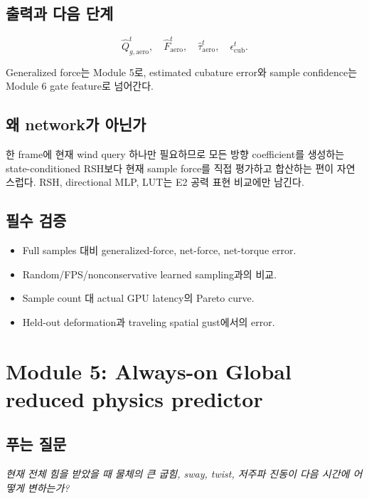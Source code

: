 \documentclass[11pt,a4paper]{article}
\begin{document}
\subsection*{출력과 다음 단계}

\begin{equation}
  \widehat Q_{g,\mathrm{aero}}^t,\quad
  \widehat F_{\mathrm{aero}}^t,\quad
  \widehat\tau_{\mathrm{aero}}^t,\quad
  \epsilon_{\mathrm{cub}}^t.
\end{equation}

Generalized force는 Module 5로,
estimated cubature error와 sample confidence는 Module 6 gate feature로 넘어간다.

\subsection*{왜 network가 아닌가}

한 frame에 현재 wind query 하나만 필요하므로
모든 방향 coefficient를 생성하는 state-conditioned RSH보다
현재 sample force를 직접 평가하고 합산하는 편이 자연스럽다.
RSH, directional MLP, LUT는 E2 공력 표현 비교에만 남긴다.

\subsection*{필수 검증}

\begin{itemize}[leftmargin=1.5em]
  \item Full samples 대비 generalized-force, net-force, net-torque error.
  \item Random/FPS/nonconservative learned sampling과의 비교.
  \item Sample count 대 actual GPU latency의 Pareto curve.
  \item Held-out deformation과 traveling spatial gust에서의 error.
\end{itemize}

\section{Module 5: Always-on Global reduced physics predictor}

\subsection*{푸는 질문}

\emph{현재 전체 힘을 받았을 때 물체의 큰 굽힘, sway, twist, 저주파 진동이
다음 시간에 어떻게 변하는가?}
\end{document}
